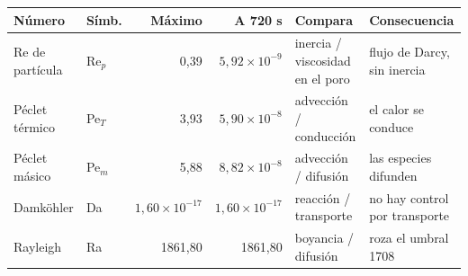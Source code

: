 \begin{tabular}{llrrll}
    \hline
    Número & Símb. & Máximo & A 720 s & Compara & Consecuencia \\
    \hline
    Re de partícula & Re$_p$ & 0,39 & $5,92\times10^{-9}$ & inercia / viscosidad en el poro & flujo de Darcy, sin inercia \\
    Péclet térmico & Pe$_T$ & 3,93 & $5,90\times10^{-8}$ & advección / conducción & el calor se conduce \\
    Péclet másico & Pe$_m$ & 5,88 & $8,82\times10^{-8}$ & advección / difusión & las especies difunden \\
    Damköhler & Da & $1,60\times10^{-17}$ & $1,60\times10^{-17}$ & reacción / transporte & no hay control por transporte \\
    Rayleigh & Ra & 1861,80 & 1861,80 & boyancia / difusión & roza el umbral 1708 \\
    \hline
\end{tabular}
